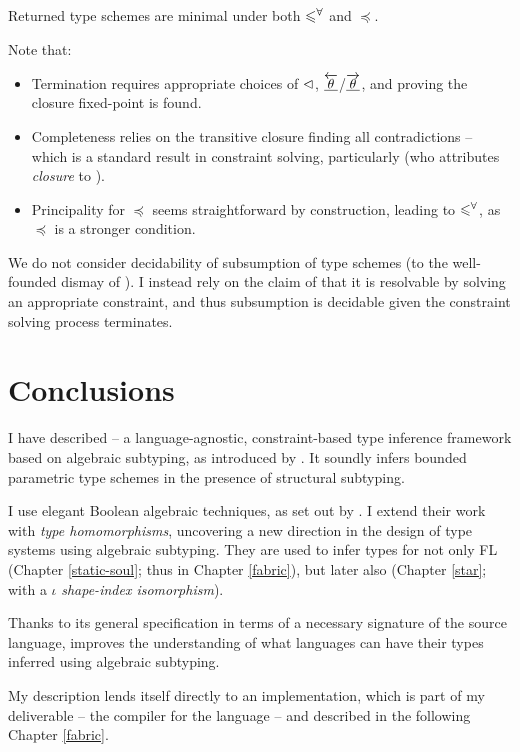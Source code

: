 \begin{conjecture}[Principality]
    Returned type schemes are minimal under both $\leqslant^\forall$ and $\preceq$.
\end{conjecture}

Note that: \begin{itemize}
    \item Termination requires appropriate choices of $\lhd$, $\underline{\overleftarrow{\theta}}$/$\underline{\overrightarrow{\theta}}$, and proving the closure fixed-point is found.
    \item Completeness relies on the transitive closure finding all contradictions -- which is a standard result in constraint solving, particularly \textcite{pottier-framework} (who attributes \emph{closure} to \textcite{closure-in-type-inference}).
    \item Principality for $\preceq$ seems straightforward by construction, leading to $\leqslant^\forall$, as $\preceq$ is a stronger condition.
\end{itemize}
We do not consider decidability of subsumption of type schemes (to the well-founded dismay of \textcite{dolan-thesis}). I instead rely on the claim of \textcite{mlstruct} that it is resolvable by solving an appropriate constraint, and thus subsumption is decidable given the constraint solving process terminates.

\section{Conclusions}
\label{sec:conclusions}

I have described \inference{} -- a language-agnostic, constraint-based type inference framework based on algebraic subtyping, as introduced by \textcite{mlsub}.
It soundly infers bounded parametric type schemes in the presence of structural subtyping. 

I use elegant Boolean algebraic techniques, as set out by \textcite{mlstruct}. I extend their work with \emph{type homomorphisms}, uncovering a new direction in the design of type systems using algebraic subtyping. They are used to infer types for not only FL (Chapter \ref{static-soul}; thus \fabric{} in Chapter \ref{fabric}), but later also \starr{} (Chapter \ref{star}; with a $\iota$ \emph{shape-index isomorphism}).

Thanks to its general specification in terms of a necessary signature of the source language, \inference{} improves the understanding of what languages can have their types inferred using algebraic subtyping.

My description lends itself directly to an implementation, which is part of my deliverable -- the \compiler{} compiler for the \fabric{} language -- and described in the following Chapter \ref{fabric}.

